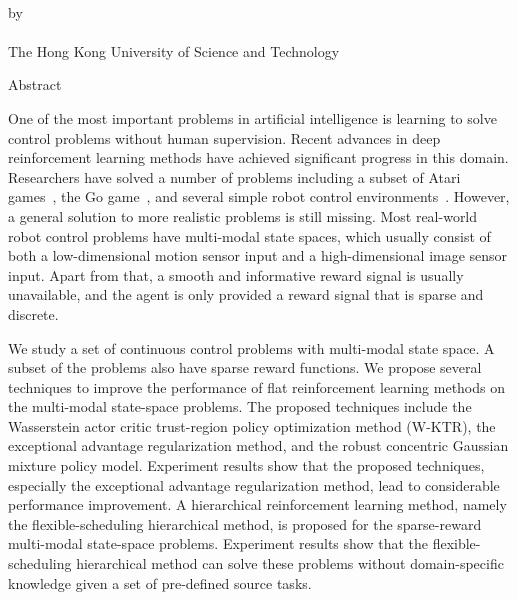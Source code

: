 \begin{center}
{\Large \thesistitle}\\
\vspace{20mm}
by \thesisauthor\\
\vspace{15mm}
\departmentname\\
\vspace{10mm}
The Hong Kong University of Science and Technology
\end{center}
\vspace{8mm}
\begin{center}
Abstract
\end{center}
One of the most important problems in artificial intelligence is learning to solve control problems without human supervision. Recent advances in deep reinforcement learning methods have achieved significant progress in this domain. Researchers have solved a number of problems including a subset of Atari games~\cite{mnih2015human}, the Go game~\cite{silver2016mastering}, and several simple robot control environments~\cite{duan2016benchmarking}.  However, a general solution to more realistic problems is still missing. Most real-world robot control problems have multi-modal state spaces, which usually consist of both a low-dimensional motion sensor input and a high-dimensional image sensor input. Apart from that, a smooth and informative reward signal is usually unavailable, and the agent is only provided a reward signal that is sparse and discrete.

We study a set of continuous control problems with multi-modal state space. A subset of the problems also have sparse reward functions. We propose several techniques to improve the performance of flat reinforcement learning methods on the multi-modal state-space problems. The proposed techniques include the Wasserstein actor critic trust-region policy optimization method (W-KTR), the exceptional advantage regularization method, and the robust concentric Gaussian mixture policy model. Experiment results show that the proposed techniques, especially the exceptional advantage regularization method, lead to considerable performance improvement. A hierarchical reinforcement learning method, namely the flexible-scheduling hierarchical method, is proposed for the sparse-reward multi-modal state-space problems. Experiment results show that the flexible-scheduling hierarchical method can solve these problems without domain-specific knowledge given a set of pre-defined source tasks.

\par
\noindent


